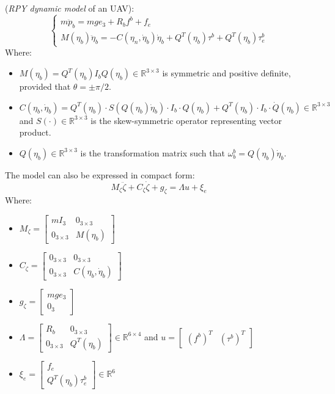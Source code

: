 \begin{definition}\label{UAV_RPY_dyn_model_def}
    (\textit{RPY dynamic model} of an UAV):
    \begin{equation}\label{UAV_RPY_dyn_model}
        \begin{cases}
            m\ddot{p}_b=mge_3+R_bf^b+f_e\\
            M(\eta_b)\ddot{\eta}_b=-C(\eta_n,\dot{\eta}_b)\dot{\eta}_b+Q^{T}(\eta_b)\tau^b+Q^{T}(\eta_b)\tau_e^b
        \end{cases}
    \end{equation}
    Where:
    \begin{itemize}
        \item $M(\eta_b)=Q^{T}(\eta_b)I_bQ(\eta_b)\in\mathbb{R}^{3\times 3}$ is symmetric and positive definite, provided that $\theta=\pm\pi/2$.
        \item $C(\eta_b,\dot{\eta}_b)=Q^{T}(\eta_b)\cdot S(Q(\eta_b)\dot{\eta}_b)\cdot I_b \cdot Q(\eta_b)+Q^{T}(\eta_b)\cdot I_b\cdot \dot{Q}(\eta_b) \in \mathbb{R}^{3\times 3}$ and $S(\cdot )\in \mathbb{R}^{3\times 3}$ is the skew-symmetric operator representing vector product.
        \item $Q(\eta_b)\in\mathbb{R}^{3\times 3}$ is the transformation matrix such that $\omega_b^b=Q(\eta_b)\dot{\eta}_b$.
    \end{itemize}
\end{definition}
The model can also be expressed in compact form:
\begin{equation}\label{UAV_RPY_compact_model}
    M_\zeta\ddot{\zeta}+C_\zeta\dot{\zeta}+g_\zeta=\Lambda u+\xi_e
\end{equation}
Where:
\begin{itemize}
    \item $M_\zeta=\begin{bmatrix}
        mI_3 &0_{3\times 3} \\ 0_{3\times 3} & M(\eta_b)
    \end{bmatrix}$
    \item $C_\zeta=\begin{bmatrix}
        0_{3\times 3} & 0_{3\times 3} \\ 0_{3\times 3} & C(\eta_b, \dot{\eta}_b)
    \end{bmatrix}$
    \item $g_\zeta=\begin{bmatrix}
        mge_3 \\0_3
    \end{bmatrix}$
    \item $\Lambda=\begin{bmatrix}
        R_b & 0_{3\times 3}\\0_{3\times 3} & Q^{T}(\eta_b)
    \end{bmatrix}\in\mathbb{R}^{6\times 4}$ and $u=\begin{bmatrix}
        \left(f^{b}\right)^{T} & \left(\tau^{b} \right)^{T}
    \end{bmatrix}$
    \item $\xi_e=\begin{bmatrix}
        f_e \\ Q^{T}(\eta_b)\tau_e^b
    \end{bmatrix} \in\mathbb{R}^{6}$
\end{itemize}
